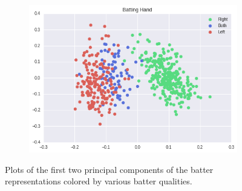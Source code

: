\documentclass{article}
\begin{document}
\begin{figure}[h]
\begin{minipage}{.5\textwidth}
    \begin{subfigure}{0.5\linewidth}
    \centering
    \includegraphics[width=1\linewidth]{batter_hand.png}
    \caption{}
    \end{subfigure}
\caption{Plots of the first two principal components of the batter representations colored by various batter qualities.}
\label{fig:batter_traits}
\end{minipage}
\end{figure}
\end{document}
